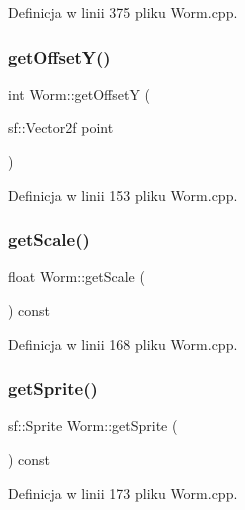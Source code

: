 Definicja w linii 375 pliku Worm.\+cpp.

\mbox{\label{class_worm_a5a9fb6f1859a7b5cf6c447ea3ae0c1e5}} 
\subsubsection{\texorpdfstring{get\+Offset\+Y()}{getOffsetY()}}
{\footnotesize\ttfamily int Worm\+::get\+OffsetY (\begin{DoxyParamCaption}\item[{sf\+::\+Vector2f}]{point }\end{DoxyParamCaption})}



Definicja w linii 153 pliku Worm.\+cpp.

\mbox{\label{class_worm_a72cf5070503bcba6423773de3367cdfd}} 
\subsubsection{\texorpdfstring{get\+Scale()}{getScale()}}
{\footnotesize\ttfamily float Worm\+::get\+Scale (\begin{DoxyParamCaption}{ }\end{DoxyParamCaption}) const}



Definicja w linii 168 pliku Worm.\+cpp.

\mbox{\label{class_worm_a9b314b9a4bb91830aac7f616ef071c07}} 
\subsubsection{\texorpdfstring{get\+Sprite()}{getSprite()}}
{\footnotesize\ttfamily sf\+::\+Sprite Worm\+::get\+Sprite (\begin{DoxyParamCaption}{ }\end{DoxyParamCaption}) const}



Definicja w linii 173 pliku Worm.\+cpp.

\mbox{\label{class_worm_a42f56e4d14502d65c500fb20bd31a561}} 

